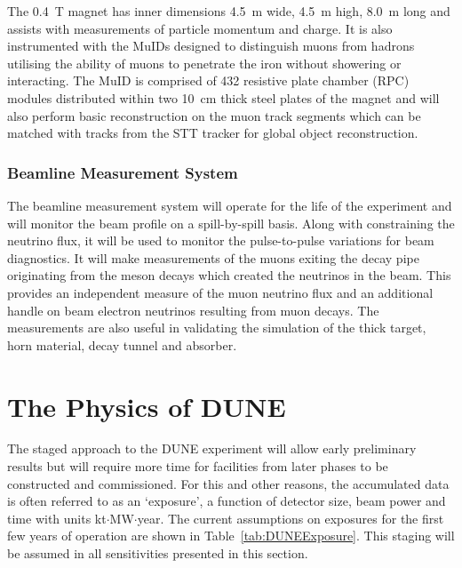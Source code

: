 The 0.4~T magnet has inner dimensions 4.5~m wide, 4.5~m high, 8.0~m long and assists with measurements of particle momentum and charge.  It is also instrumented with the MuIDs designed to distinguish muons from hadrons utilising the ability of muons to penetrate the iron without showering or interacting.  The MuID is comprised of 432 resistive plate chamber (RPC) modules distributed within two 10~cm thick steel plates of the magnet and will also perform basic reconstruction on the muon track segments which can be matched with tracks from the STT tracker for global object reconstruction.

\subsubsection{Beamline Measurement System}\label{sec:BLM}

The beamline measurement system will operate for the life of the experiment and will monitor the beam profile on a spill-by-spill basis.  Along with constraining the neutrino flux, it will be used to monitor the pulse-to-pulse variations for beam diagnostics.  It will make measurements of the muons exiting the decay pipe originating from the meson decays which created the neutrinos in the beam.  This provides an independent measure of the muon neutrino flux and an additional handle on beam electron neutrinos resulting from muon decays.  The measurements are also useful in validating the simulation of the thick target, horn material, decay tunnel and absorber.

\section{The Physics of DUNE}\label{sec:DUNEPhysics}

The staged approach to the DUNE experiment will allow early preliminary results but will require more time for facilities from later phases to be constructed and commissioned.  For this and other reasons, the accumulated data is often referred to as an `exposure', a function of detector size, beam power and time with units kt$\cdot$MW$\cdot$year.  The current assumptions on exposures for the first few years of operation are shown in Table~\ref{tab:DUNEExposure}.  This staging will be assumed in all sensitivities presented in this section.

